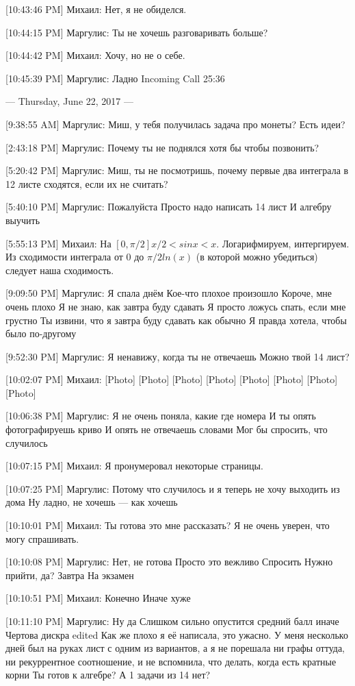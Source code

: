 \documentclass{article}
\begin{document}
[10:43:46 PM] Михаил:
Нет, я не обиделся.

[10:44:15 PM] Маргулис:
Ты не хочешь разговаривать больше?

[10:44:42 PM] Михаил:
Хочу, но не о себе.

[10:45:39 PM] Маргулис:
Ладно
Incoming Call 25:36

--- Thursday, June 22, 2017 ---

[9:38:55 AM] Маргулис:
Миш, у тебя получилась задача про монеты? Есть идеи?

[2:43:18 PM] Маргулис:
Почему ты не поднялся хотя бы чтобы позвонить?

[5:20:42 PM] Маргулис:
Миш, ты не посмотришь, почему первые два интеграла в 12 листе сходятся, если их не считать?

[5:40:10 PM] Маргулис:
Пожалуйста
 Просто надо написать 14 лист
 И алгебру выучить

[5:55:13 PM] Михаил:
На $[0, \pi/2] x/2 < sin x < x$. Логарифмируем, интергируем. Из сходимости интеграла от 0 до $\pi/2 ln(x)$ (в которой можно убедиться) следует наша сходимость.

[9:09:50 PM] Маргулис:
Я спала днём
 Кое-что плохое произошло
 Короче, мне очень плохо
 Я не знаю, как завтра буду сдавать
 Я просто ложусь спать, если мне грустно
 Ты извини, что я завтра буду сдавать как обычно
 Я правда хотела, чтобы было по-другому

[9:52:30 PM] Маргулис:
Я ненавижу, когда ты не отвечаешь
 Можно твой 14 лист?

[10:02:07 PM] Михаил:
[Photo]
 [Photo]
 [Photo]
 [Photo]
 [Photo]
 [Photo]
 [Photo]
 [Photo]

[10:06:38 PM] Маргулис:
Я не очень поняла, какие где номера
 И ты опять фотографируешь криво
 И опять не отвечаешь словами
 Мог бы спросить, что случилось

[10:07:15 PM] Михаил:
Я пронумеровал некоторые страницы.

[10:07:25 PM] Маргулис:
Потому что случилось и я теперь не хочу выходить из дома
 Ну ладно, не хочешь — как хочешь

[10:10:01 PM] Михаил:
Ты готова это мне рассказать? Я не очень уверен, что могу спрашивать.

[10:10:08 PM] Маргулис:
Нет, не готова
 Просто это вежливо
 Спросить
 Нужно прийти, да?
 Завтра
 На экзамен

[10:10:51 PM] Михаил:
Конечно
 Иначе хуже

[10:11:10 PM] Маргулис:
Ну да
 Слишком сильно опустится средний балл иначе
 Чертова дискра
edited 
Как же плохо я её написала, это ужасно. У меня несколько дней был на руках лист с одним из вариантов, а я не порешала ни графы оттуда, ни рекуррентное соотношение, и не вспомнила, что делать, когда есть кратные корни
 Ты готов к алгебре?
 А 1 задачи из 14 нет?
\end{document}
